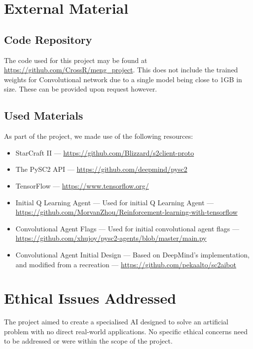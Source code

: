 \begin{appendices}
\chapter{External Material}

\section{Code Repository}
The code used for this project may be found at
\url{https://github.com/CrossR/meng_project}. This does not include the
trained weights for Convolutional network due to a single model being close to
1GB in size. These can be provided upon request however.

\section{Used Materials}
As part of the project, we made use of the following resources:

\begin{itemize}
    \item StarCraft II --- \url{https://github.com/Blizzard/s2client-proto}
    \item The PySC2 API --- \url{https://github.com/deepmind/pysc2}
    \item TensorFlow --- \url{https://www.tensorflow.org/}
    \item Initial Q Learning Agent --- Used for initial Q Learning Agent ---
        \url{https://github.com/MorvanZhou/Reinforcement-learning-with-tensorflow}
    \item Convolutional Agent Flags --- Used for initial convolutional agent
        flags ---\url{https://github.com/xhujoy/pysc2-agents/blob/master/main.py}
    \item Convolutional Agent Initial Design --- Based on DeepMind's
        implementation, and modified from a recreation ---
        \url{https://github.com/pekaalto/sc2aibot}
\end{itemize}

\chapter{Ethical Issues Addressed}
The project aimed to create a specialised AI designed to solve an artificial
problem with no direct real-world applications.
No specific ethical concerns need to be addressed or were within the scope of the
project.

\end{appendices}
